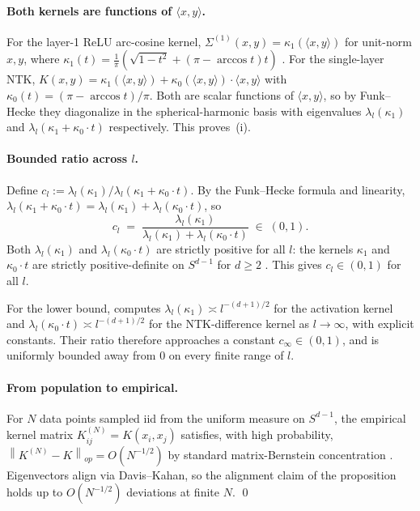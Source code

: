 \documentclass[11pt,letterpaper]{article}
\newcommand{\norm}[1]{\left\|#1\right\|}
\begin{document}
\paragraph{Both kernels are functions of $\langle x, y\rangle$.}
For the layer-1 ReLU arc-cosine kernel,
$\Sigma^{(1)}(x, y) = \kappa_1(\langle x, y\rangle)$ for unit-norm
$x, y$, where $\kappa_1(t) = \tfrac{1}{\pi}(\sqrt{1-t^2} + (\pi - \arccos t) t)$
\citep{cho2009kernel}. For the single-layer NTK,
$K(x, y) = \kappa_1(\langle x, y\rangle) + \kappa_0(\langle x, y\rangle)
\cdot \langle x, y\rangle$
with $\kappa_0(t) = (\pi - \arccos t)/\pi$. Both are scalar functions of
$\langle x, y\rangle$, so by Funk--Hecke they diagonalize in the
spherical-harmonic basis with eigenvalues $\lambda_l(\kappa_1)$ and
$\lambda_l(\kappa_1 + \kappa_0 \cdot t)$ respectively. This proves~(i).

\paragraph{Bounded ratio across $l$.}
Define $c_l := \lambda_l(\kappa_1) / \lambda_l(\kappa_1 + \kappa_0 \cdot t)$.
By the Funk--Hecke formula and linearity,
$\lambda_l(\kappa_1 + \kappa_0 \cdot t)
= \lambda_l(\kappa_1) + \lambda_l(\kappa_0 \cdot t)$, so
\[
c_l \;=\; \frac{\lambda_l(\kappa_1)}{\lambda_l(\kappa_1) + \lambda_l(\kappa_0 \cdot t)}
\;\in\; (0, 1).
\]
Both $\lambda_l(\kappa_1)$ and $\lambda_l(\kappa_0 \cdot t)$ are strictly
positive for all $l$: the kernels $\kappa_1$ and $\kappa_0 \cdot t$ are
strictly positive-definite on $S^{d-1}$ for $d \geq 2$ \citep{bach2017breaking}.
This gives $c_l \in (0, 1)$ for all $l$.

For the lower bound, \citet{bach2017breaking} computes
$\lambda_l(\kappa_1) \asymp l^{-(d+1)/2}$ for the activation kernel
and $\lambda_l(\kappa_0 \cdot t) \asymp l^{-(d+1)/2}$ for the
NTK-difference kernel as $l \to \infty$, with explicit constants. Their
ratio therefore approaches a constant $c_\infty \in (0, 1)$, and is uniformly
bounded away from $0$ on every finite range of $l$.

\paragraph{From population to empirical.}
For $N$ data points sampled iid from the uniform measure on $S^{d-1}$,
the empirical kernel matrix $K^{(N)}_{ij} = K(x_i, x_j)$ satisfies, with
high probability, $\norm{K^{(N)} - K}_{op} = O(N^{-1/2})$ by standard
matrix-Bernstein concentration \citep{tropp2015introduction}. Eigenvectors
align via Davis--Kahan, so the alignment claim of the proposition holds
up to $O(N^{-1/2})$ deviations at finite $N$. \qed











\end{document}
